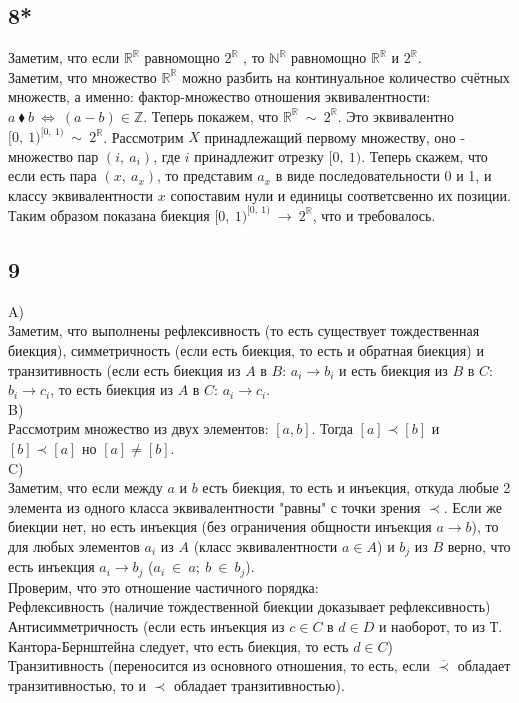 		\subsection{8*}
		Заметим, что если $\mathbb{R}^{\mathbb{R}}$ равномощно $2^{\mathbb{R}}$ , то $\mathbb{N}^{\mathbb{R}}$ равномощно $\mathbb{R}^{\mathbb{R}}$ и $2^{\mathbb{R}}$.\\
		Заметим, что множество $\mathbb{R}^{\mathbb{R}}$ можно разбить на континуальное количество счётных множеств, а именно: фактор-множество отношения эквивалентности: $a \ \blacklozenge \ b \: \Leftrightarrow \:  (a - b) \in \mathbb{Z}$. Теперь покажем, что $\mathbb{R}^{\mathbb{R}} \: \sim \: 2^{\mathbb{R}}$. Это эквивалентно ${[0,\: 1)}^{[0,\: 1)} \: \sim \: 2^{\mathbb{R}}$. Рассмотрим $X$ принадлежащий первому множеству, оно - множество пар $(i,\: a_i)$, где $i$ принадлежит отрезку $[0,\: 1)$. Теперь скажем, что если есть пара $(x,\:a_x)$, то представим $a_x$ в виде последовательности 0 и 1, и классу эквивалентности $x$ сопоставим нули и единицы соответсвенно их позиции. Таким образом показана биекция ${[0,\: 1)}^{[0,\: 1)} \: \to \: 2^{\mathbb{R}}$, что и требовалось.
		
		\subsection{9}
		A)\\
		Заметим, что выполнены рефлексивность (то есть существует тождественная биекция), симметричность (если есть биекция, то есть и обратная биекция) и транзитивность (если есть биекция из $A$ в $B$: $a_i \to b_i$ и есть биекция из $B$ в $C$: $b_i \to c_i$, то есть биекция из $A$ в $C$: $a_i \to c_i$.
		\\
		B)\\
		Рассмотрим множество из двух элементов: $[a,b]$. Тогда $[a] \prec [b]$ и $[b] \prec [a]$ но $[a] \ne [b]$.
		\\
		C)\\
		Заметим, что если между $a$ и $b$ есть биекция, то есть и инъекция, откуда любые 2 элемента из одного класса эквивалентности "равны" с точки зрения $\prec$. Если же биекции нет, но есть инъекция (без ограничения общности инъекция $a \to b$), то для любых элементов $a_i$ из $A$ (класс эквивалентности $a \in A$) и $b_j$ из $B$ верно, что есть инъекция $a_i \to b_j$ ($a_i\: \in \:a; \ b\: \in \:b_j$).\\		
		Проверим, что это отношение частичного порядка: \\
		Рефлексивность (наличие тождественной биекции доказывает рефлексивность)\\
		Антисимметричность (если есть инъекция из $c \in C$ в $d \in D$ и наоборот, то из Т. Кантора-Бернштейна следует, что есть биекция, то есть $d \in C$)\\
		Транзитивность (переносится из основного отношения, то есть, если $\overline{\prec}$ обладает транзитивностью, то и $\prec$ обладает транзитивностью).
		
